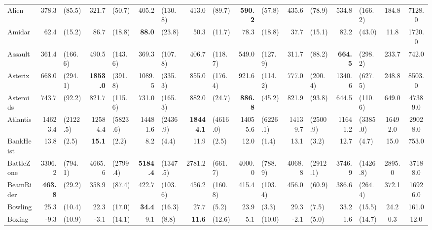 \begin{landscape}
\begin{changemargin}{0cm}{0cm}
\begin{center}
\begin{table}[!htbp]
\begin{tabular}{l|rl|rl|rl|rl|rl|rl|rl|c|c}
\midrule
Alien          &    378.3 &    (85.5) &    321.7 &     (50.7) &    405.2 &    (130.8) &    413.0 &     (89.7) &\textbf{    590.2 }&     (57.8) &    435.6 &     (78.9) &    534.8 &    (166.2) &    184.8 &   7128.0 \\
Amidar         &     62.4 &    (15.2) &     86.7 &     (18.8) &\textbf{     88.0 }&     (23.8) &     50.3 &     (11.7) &     78.3 &     (18.8) &     37.7 &     (15.1) &     82.2 &     (43.0) &     11.8 &   1720.0 \\
Assault        &    361.4 &   (166.6) &    490.5 &    (143.6) &    369.3 &    (107.8) &    406.7 &    (118.7) &    549.0 &    (127.9) &    311.7 &     (88.2) &\textbf{    664.5 }&    (298.2) &    233.7 &    742.0 \\
Asterix        &    668.0 &   (294.1) &\textbf{   1853.0 }&    (391.8) &   1089.5 &    (335.3) &    855.0 &    (176.4) &    921.6 &    (114.2) &    777.0 &    (200.4) &   1340.6 &    (627.5) &    248.8 &   8503.0 \\
Asteroids      &    743.7 &    (92.2) &    821.7 &    (115.6) &    731.0 &    (165.3) &    882.0 &     (24.7) &\textbf{    886.8 }&     (45.2) &    821.9 &     (93.8) &    644.5 &    (110.6) &    649.0 &  47389.0 \\
Atlantis       &  14623.4 &  (2122.5) &  12584.4 &   (5823.6) &  14481.6 &   (2436.9) &\textbf{  18444.1 }&   (4616.0) &  14055.6 &   (6226.1) &  14139.7 &   (2500.9) &  11641.2 &   (3385.0) &  16492.0 &  29028.0 \\
BankHeist      &     13.8 &     (2.5) &\textbf{     15.1 }&      (2.2) &      8.2 &      (4.4) &     11.9 &      (2.5) &     12.0 &      (1.4) &     13.1 &      (3.2) &     12.7 &      (4.7) &     15.0 &    753.0 \\
BattleZone     &   3306.2 &   (794.1) &   4665.6 &   (2799.4) &\textbf{   5184.4 }&   (1347.5) &   2781.2 &    (661.7) &   4000.0 &    (788.9) &   4068.8 &   (2912.1) &   3746.9 &   (1426.8) &   2895.0 &  37188.0 \\
BeamRider      &\textbf{    463.8 }&    (29.2) &    358.9 &     (87.4) &    422.7 &    (103.6) &    456.2 &    (160.8) &    415.4 &    (103.4) &    456.0 &     (60.9) &    386.6 &    (264.4) &    372.1 &  16926.0 \\
Bowling        &     25.3 &    (10.4) &     22.3 &     (17.0) &\textbf{     34.4 }&     (16.3) &     27.7 &      (5.2) &     23.9 &      (3.3) &     29.3 &      (7.5) &     33.2 &     (15.5) &     24.2 &    161.0 \\
Boxing         &     -9.3 &    (10.9) &     -3.1 &     (14.1) &      9.1 &      (8.8) &\textbf{     11.6 }&     (12.6) &      5.1 &     (10.0) &     -2.1 &      (5.0) &      1.6 &     (14.7) &      0.3 &     12.0 \\

\end{tabular}
\end{table}
\end{center}
\end{changemargin}
\end{landscape}
